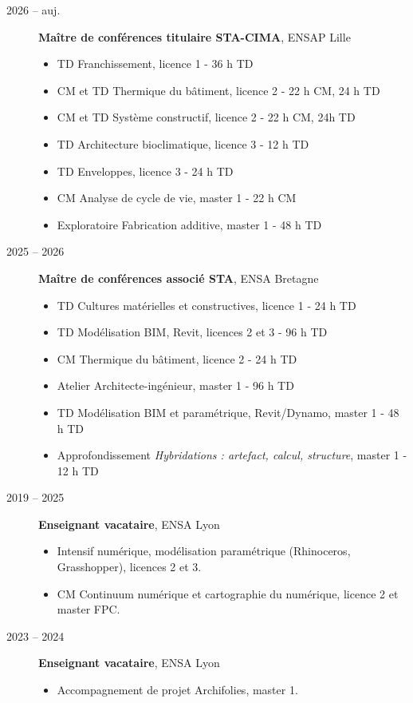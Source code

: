 \documentclass[11pt,a4paper]{article}
\begin{document}
\begin{description}
  \item[2026 -- auj.] \textbf{Maître de conférences titulaire STA-CIMA}, ENSAP Lille
  \begin{itemize}
    \item TD Franchissement, licence 1 - 36 h TD
    \item CM et TD Thermique du bâtiment, licence 2 - 22 h CM, 24 h TD
    \item CM et TD Système constructif, licence 2 - 22 h CM, 24h TD
    \item TD Architecture bioclimatique, licence 3 - 12 h TD
    \item TD Enveloppes, licence 3 - 24 h TD
    \item CM Analyse de cycle de vie, master 1 - 22 h CM
    \item Exploratoire Fabrication additive, master 1 - 48 h TD
  \end{itemize}

  \item[2025 -- 2026] \textbf{Maître de conférences associé STA}, ENSA Bretagne
  \begin{itemize}
    \item TD Cultures matérielles et constructives, licence 1 - 24 h TD
    \item TD Modélisation BIM, Revit, licences 2 et 3 - 96 h TD
    \item CM Thermique du bâtiment, licence 2 - 24 h TD
    \item Atelier Architecte-ingénieur, master 1 - 96 h TD
    \item TD Modélisation BIM et paramétrique, Revit/Dynamo, master 1 - 48 h TD
    \item Approfondissement \emph{Hybridations : artefact, calcul, structure}, master 1 - 12 h TD
  \end{itemize}

  \item[2019 -- 2025] \textbf{Enseignant vacataire}, ENSA Lyon
  \begin{itemize}
    \item Intensif numérique, modélisation paramétrique (Rhinoceros, Grasshopper), licences 2 et 3.
    \item CM Continuum numérique et cartographie du numérique, licence 2 et master FPC.
  \end{itemize}

  \item[2023 -- 2024] \textbf{Enseignant vacataire}, ENSA Lyon
  \begin{itemize}
    \item Accompagnement de projet Archifolies, master 1.
  \end{itemize}


\end{description}
\end{document}
